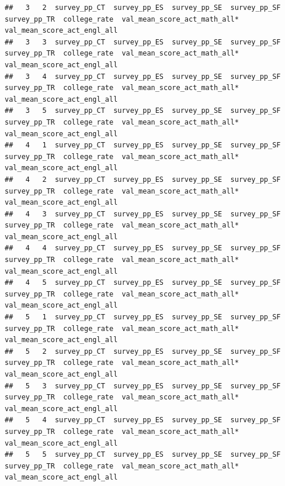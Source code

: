 \documentclass[
  man]{apa6}
\begin{document}
\begin{verbatim}
##   3   2  survey_pp_CT  survey_pp_ES  survey_pp_SE  survey_pp_SF  survey_pp_TR  college_rate  val_mean_score_act_math_all*  val_mean_score_act_engl_all
##   3   3  survey_pp_CT  survey_pp_ES  survey_pp_SE  survey_pp_SF  survey_pp_TR  college_rate  val_mean_score_act_math_all*  val_mean_score_act_engl_all
##   3   4  survey_pp_CT  survey_pp_ES  survey_pp_SE  survey_pp_SF  survey_pp_TR  college_rate  val_mean_score_act_math_all*  val_mean_score_act_engl_all
##   3   5  survey_pp_CT  survey_pp_ES  survey_pp_SE  survey_pp_SF  survey_pp_TR  college_rate  val_mean_score_act_math_all*  val_mean_score_act_engl_all
##   4   1  survey_pp_CT  survey_pp_ES  survey_pp_SE  survey_pp_SF  survey_pp_TR  college_rate  val_mean_score_act_math_all*  val_mean_score_act_engl_all
##   4   2  survey_pp_CT  survey_pp_ES  survey_pp_SE  survey_pp_SF  survey_pp_TR  college_rate  val_mean_score_act_math_all*  val_mean_score_act_engl_all
##   4   3  survey_pp_CT  survey_pp_ES  survey_pp_SE  survey_pp_SF  survey_pp_TR  college_rate  val_mean_score_act_math_all*  val_mean_score_act_engl_all
##   4   4  survey_pp_CT  survey_pp_ES  survey_pp_SE  survey_pp_SF  survey_pp_TR  college_rate  val_mean_score_act_math_all*  val_mean_score_act_engl_all
##   4   5  survey_pp_CT  survey_pp_ES  survey_pp_SE  survey_pp_SF  survey_pp_TR  college_rate  val_mean_score_act_math_all*  val_mean_score_act_engl_all
##   5   1  survey_pp_CT  survey_pp_ES  survey_pp_SE  survey_pp_SF  survey_pp_TR  college_rate  val_mean_score_act_math_all*  val_mean_score_act_engl_all
##   5   2  survey_pp_CT  survey_pp_ES  survey_pp_SE  survey_pp_SF  survey_pp_TR  college_rate  val_mean_score_act_math_all*  val_mean_score_act_engl_all
##   5   3  survey_pp_CT  survey_pp_ES  survey_pp_SE  survey_pp_SF  survey_pp_TR  college_rate  val_mean_score_act_math_all*  val_mean_score_act_engl_all
##   5   4  survey_pp_CT  survey_pp_ES  survey_pp_SE  survey_pp_SF  survey_pp_TR  college_rate  val_mean_score_act_math_all*  val_mean_score_act_engl_all
##   5   5  survey_pp_CT  survey_pp_ES  survey_pp_SE  survey_pp_SF  survey_pp_TR  college_rate  val_mean_score_act_math_all*  val_mean_score_act_engl_all
\end{verbatim}
\end{document}
